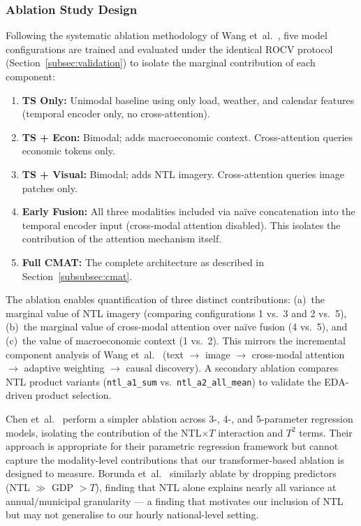 \subsubsection{Ablation Study Design}
\label{subsubsec:ablation}

Following the systematic ablation methodology of Wang et~al.~\cite{wang_causal-aware_2025}, five model configurations are trained and evaluated under the identical ROCV protocol (Section~\ref{subsec:validation}) to isolate the marginal contribution of each component:

\begin{enumerate}
    \item \textbf{TS Only:} Unimodal baseline using only load, weather, and calendar features (temporal encoder only, no cross-attention).
    \item \textbf{TS + Econ:} Bimodal; adds macroeconomic context. Cross-attention queries economic tokens only.
    \item \textbf{TS + Visual:} Bimodal; adds NTL imagery. Cross-attention queries image patches only.
    \item \textbf{Early Fusion:} All three modalities included via na\"ive concatenation into the temporal encoder input (cross-modal attention disabled). This isolates the contribution of the attention mechanism itself.
    \item \textbf{Full CMAT:} The complete architecture as described in Section~\ref{subsubsec:cmat}.
\end{enumerate}

The ablation enables quantification of three distinct contributions: (a)~the marginal value of NTL imagery (comparing configurations 1 vs.\ 3 and 2 vs.\ 5), (b)~the marginal value of cross-modal attention over na\"ive fusion (4 vs.\ 5), and (c)~the value of macroeconomic context (1 vs.\ 2). This mirrors the incremental component analysis of Wang et~al.~\cite{wang_causal-aware_2025} (text $\to$ image $\to$ cross-modal attention $\to$ adaptive weighting $\to$ causal discovery). A secondary ablation compares NTL product variants (\texttt{ntl\_a1\_sum} vs.\ \texttt{ntl\_a2\_all\_mean}) to validate the EDA-driven product selection.

Chen et~al.~\cite{chen_monthly_2025} perform a simpler ablation across 3-, 4-, and 5-parameter regression models, isolating the contribution of the NTL$\times T$ interaction and $T^2$ terms. Their approach is appropriate for their parametric regression framework but cannot capture the modality-level contributions that our transformer-based ablation is designed to measure. Borunda et~al.~\cite{borunda_machine_2025} similarly ablate by dropping predictors (NTL $\gg$ GDP $> T$), finding that NTL alone explains nearly all variance at annual/municipal granularity — a finding that motivates our inclusion of NTL but may not generalise to our hourly national-level setting.

